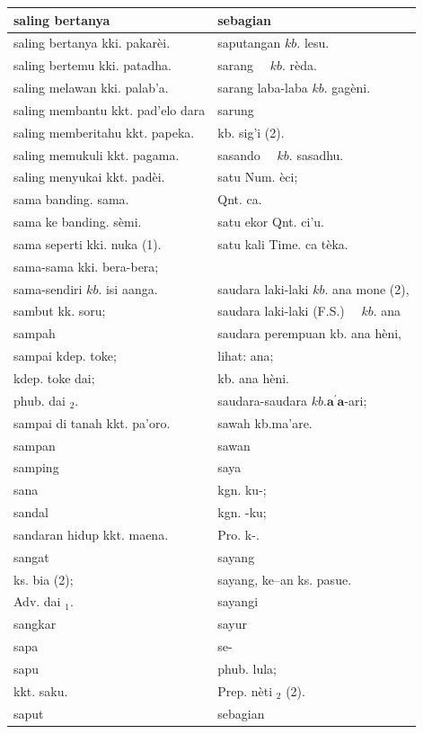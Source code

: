 \documentclass[10pt]{article}
\begin{document}
\begin{center}
\begin{tabular}{|l|l|}
\hline
saling bertanya & sebagian \\
\hline
saling bertanya kki. pakarèi. & saputangan \(k b\). lesu. \\
\hline
saling bertemu kki. patadha. & sarang \(\quad k b\). rèda. \\
\hline
saling melawan kki. palab'a. & sarang laba-laba \(k b\). gagèni. \\
\hline
saling membantu kkt. pad'elo dara & sarung \\
\hline
saling memberitahu kkt. papeka. & kb. sig'i (2). \\
\hline
saling memukuli kkt. pagama. & sasando \(\quad k b\). sasadhu. \\
\hline
saling menyukai kkt. padèi. & satu Num. èci; \\
\hline
sama banding. sama. & Qnt. ca. \\
\hline
sama ke banding. sèmi. & satu ekor Qnt. ci'u. \\
\hline
sama seperti kki. nuka (1). & satu kali Time. ca tèka. \\
\hline
sama-sama kki. bera-bera; &  \\
\hline
sama-sendiri \(k b\). isi aanga. & saudara laki-laki \(k b\). ana mone (2), \\
\hline
sambut kk. soru; & saudara laki-laki (F.S.) \(\quad k b\). ana \\
\hline
sampah & saudara perempuan kb. ana hèni, \\
\hline
sampai kdep. toke; & lihat: ana; \\
\hline
kdep. toke dai; & kb. ana hèni. \\
\hline
phub. dai \({ }_{2}\). & saudara-saudara \(k b . \boldsymbol{a}^{\prime} \mathbf{a}\)-ari; \\
\hline
sampai di tanah kkt. pa'oro. & sawah kb.ma'are. \\
\hline
sampan & sawan \\
\hline
samping & saya \\
\hline
sana & kgn. ku-; \\
\hline
sandal & kgn. -ku; \\
\hline
sandaran hidup kkt. maena. & Pro. k-. \\
\hline
sangat & sayang \\
\hline
ks. bia (2); & sayang, ke--an ks. pasue. \\
\hline
Adv. dai \({ }_{1}\). & sayangi \\
\hline
sangkar & sayur \\
\hline
sapa & se- \\
\hline
sapu & phub. lula; \\
\hline
kkt. saku. & Prep. nèti \({ }_{2}\) (2). \\
\hline
saput & sebagian \\
\hline
\end{tabular}
\end{center}
\end{document}
